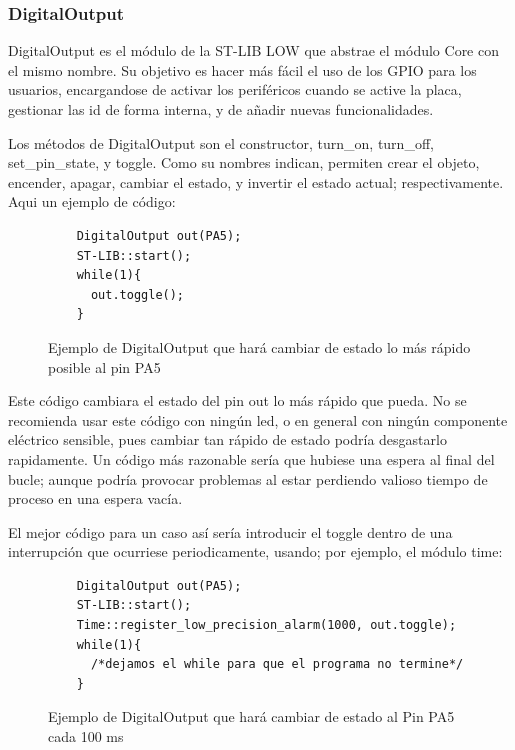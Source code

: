 \documentclass{report}
\begin{document}
\subsubsection{DigitalOutput}
DigitalOutput es el módulo de la ST-LIB LOW que abstrae el módulo Core con el mismo nombre. Su objetivo es hacer más fácil el uso de los GPIO para los usuarios, encargandose de activar los periféricos cuando se active la placa, gestionar las id de forma interna, y de añadir nuevas funcionalidades. 
\par \vspace{0.3cm}
Los métodos de DigitalOutput son el constructor, turn\_on, turn\_off, set\_pin\_state, y toggle. Como su nombres indican, permiten crear el objeto, encender, apagar, cambiar el estado, y invertir el estado actual; respectivamente. Aqui un ejemplo de código: 
\begin{figure}[H]
  \begin{lstlisting}
    DigitalOutput out(PA5);
    ST-LIB::start();
    while(1){
      out.toggle();
    }
  \end{lstlisting}
  \caption{Ejemplo de DigitalOutput que hará cambiar de estado lo más rápido posible al pin PA5}
  \label{DigitalOutputCode}
\end{figure}
\par \vspace{0.3cm}
Este código cambiara el estado del pin out lo más rápido que pueda. No se recomienda usar este código con ningún led, o en general con ningún componente eléctrico sensible, pues cambiar tan rápido de estado podría desgastarlo rapidamente. Un código más razonable sería que hubiese una espera al final del bucle; aunque podría provocar problemas al estar perdiendo valioso tiempo de proceso en una espera vacía. \par
El mejor código para un caso así sería introducir el toggle dentro de una interrupción que ocurriese periodicamente, usando; por ejemplo, el módulo time: 
\begin{figure}[H]
  \begin{lstlisting}
    DigitalOutput out(PA5);
    ST-LIB::start();
    Time::register_low_precision_alarm(1000, out.toggle);
    while(1){
      /*dejamos el while para que el programa no termine*/
    }
  \end{lstlisting}
  \caption{Ejemplo de DigitalOutput que hará cambiar de estado al Pin PA5 cada 100 ms}
  \label{DigitalOutputBetterCode}
\end{figure}
\end{document}
